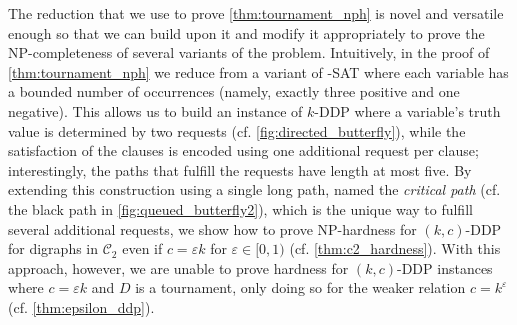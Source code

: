 \documentclass[a4paper,UKenglish,cleveref, autoref, thm-restate]{lipics-v2021}
\renewcommand{\NP}{{\sf NP}\xspace}
\newcommand{\pname}[1]{{\sc #1}}
\begin{document}
The reduction that we use to prove \autoref{thm:tournament_nph} is novel and versatile enough so
that we can build upon it and modify it appropriately to prove the \NP-completeness of
several variants of the problem. Intuitively, in the proof of \autoref{thm:tournament_nph} we
reduce from a variant of \pname{3-SAT} where each variable has a bounded number of occurrences (namely, exactly three positive and one negative). This
allows us to build an instance of \pname{$k$-DDP} where a variable's truth value is determined by
two requests (cf. \autoref{fig:directed_butterfly}), while the satisfaction of the clauses is encoded using one additional
request per clause; interestingly, the paths that fulfill the requests have length at
most five. By extending this construction using a single long path, named the \emph{critical path} (cf. the black path in \autoref{fig:queued_butterfly2}), which is the unique way to fulfill several additional requests, we show how to prove \NP-hardness for \pname{$(k,c)$-DDP} for digraphs
in $\mathcal{C}_2$ even if $c = \varepsilon k$ for $\varepsilon \in [0,1)$ (cf.
\autoref{thm:c2_hardness}).
With this approach, however, we are unable to prove hardness for \pname{$(k,c)$-DDP} instances where $c = \varepsilon k$ and $D$ is a tournament, only doing so for the weaker relation $c = k^\varepsilon$ (cf. \autoref{thm:epsilon_ddp}).
\end{document}

